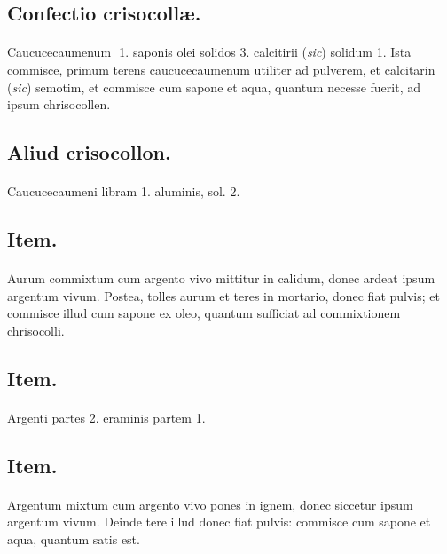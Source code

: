 \documentclass[a4paper, 11pt, oneside, polutonikogreek, italian]{article}
\newcommand*\svgaaa{}
\begin{document}
\subsection{Confectio crisocollæ.}
\paragraph{}
Caucucecaumenum $\svgaaa$ 1. saponis olei solidos 3. calcitirii (\emph{sic}) solidum 1. Ista commisce, primum terens caucucecaumenum utiliter ad pulverem, et calcitarin (\emph{sic}) semotim, et commisce cum sapone et aqua, quantum necesse fuerit, ad ipsum chrisocollen.

\subsection{Aliud crisocollon.}
\paragraph{}
Caucucecaumeni libram 1. aluminis, sol. 2.

\subsection{Item.}
\paragraph{}
Aurum commixtum cum argento vivo mittitur in calidum, donec ardeat ipsum argentum vivum. Postea, tolles aurum et teres in mortario, donec fiat pulvis; et commisce illud cum sapone ex oleo, quantum sufficiat ad commixtionem chrisocolli.

\subsection{Item.}
\paragraph{}
Argenti partes 2. eraminis partem 1.

\subsection{Item.}
\paragraph{}
Argentum mixtum cum argento vivo pones in ignem, donec siccetur ipsum argentum vivum. Deinde tere illud donec fiat pulvis: commisce cum sapone et aqua, quantum satis est.
\end{document}
